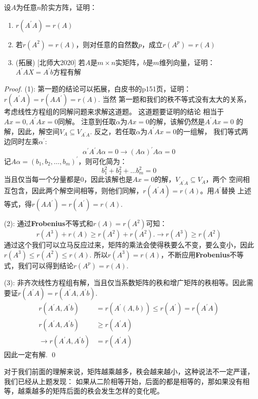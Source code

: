 \begin{ex}[吉林大学2013]
	设$A$为任意$n$阶实方阵，证明：
	\begin{enumerate}
		\item $r(A^\prime A) = r(A)$
		\item 若$r(A^2)=r(A)$，则对任意的自然数$p$，成立$r(A^p)=r(A)$
		\item (拓展) [北师大2020] 若$A$是$m \times n$实矩阵，$b$是$m$维列向量，证明： $A^\prime AX = A^\prime b$方程有解
	\end{enumerate}
\end{ex}

\begin{proof}
	
	(1): 第一题的结论可以拓展，白皮书的p151页，证明：$r(A^\prime A)=r(A A^\prime)=r(A)$. 当然
	第一题和我们的秩不等式没有太大的关系，考虑线性方程组的同解问题来求解这道题。 这道题要证明的结论
	相当于 $Ax=0, A^\prime Ax=0$同解。 注意到任取$\alpha$为$Ax=0$的解，该解仍然是$A^\prime Ax=0$
	的解，因此，解空间$V_A \subseteq V_{A^\prime A}$. 反之，若任取$\alpha$为$A^\prime Ax=0$的一组解，
	我们等式两边同时左乘$\alpha^\prime$:
	$$
		\alpha^\prime A^\prime A \alpha = 0 \to 
		(A\alpha)^\prime A \alpha = 0
	$$
	记$A\alpha = (b_1,b_2,\dots,b_m)^\prime$，则可化简为：
	$$
		b_1^2 + b_2^2 + \dots b_m^2 = 0
	$$
	当且仅当每一个分量都是0，因此该解也是$Ax=0$的解，$V_{A^\prime A} \subseteq V_A$，两个
	空间相互包含，因此两个解空间相等，则他们同解，$r(A^\prime A) = r(A)$。用$A^\prime$替换
	上述等式，得$r(A A^\prime)=r(A^\prime)=r(A)$.

	(2): 通过\textbf{Frobenius}不等式和$r(A)=r(A^2)$可知：
	$$
		r(A^3) + r(A) \geq r(A^2) + r(A^2). \to 
		r(A^3) \geq r(A^2)
	$$
	通过这个我们可以立马反应过来，矩阵的乘法会使得秩要么不变，要么变小，因此$r(A^3) \leq r(A^2) \leq r(A)$.
	所以$r(A^3)=r(A)$，不断应用\textbf{Frobenius}不等式，我们可以得到结论$r(A^p)=r(A)$.

	(3): 非齐次线性方程组有解，当且仅当系数矩阵的秩和增广矩阵的秩相等。因此需要证$r(A^ \prime A)=r(A^ \prime A, A^\prime b)$.
	\begin{align*}
		r(A^\prime A, A^\prime b) &= r(A^\prime (A, b)) \leq r(A^\prime) = r(A^\prime A)
		\\
		r(A^\prime A, A^\prime b) &\geq r(A^\prime A)
		\\
		\to r(A^\prime A, A^\prime b) &= r(A^\prime A)
	\end{align*}
	因此一定有解.
	\qed
\end{proof}

对于我们前面的理解来说，矩阵越乘越多，秩会越来越小，这种说法不一定严谨，我们已经从上题发现：
如果从二阶相等开始，后面的都是相等的，那如果没有相等，越乘越多的矩阵后面的秩会发生怎样的变化呢。

